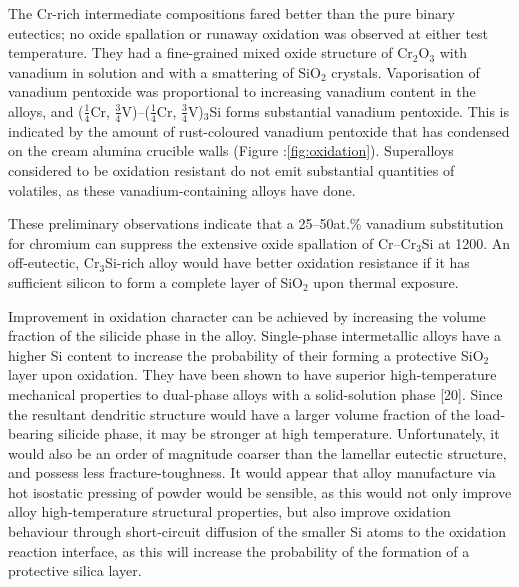 The Cr-rich intermediate compositions fared better than the pure binary eutectics; no oxide spallation or runaway oxidation was observed at either test temperature.  They had a fine-grained mixed oxide structure of Cr$_2$O$_3$ with vanadium in solution and with a smattering of SiO$_2$ crystals.  Vaporisation of vanadium pentoxide was proportional to increasing vanadium content in the alloys, and ($\frac{1}{4}$Cr, $\frac{3}{4}$V)--($\frac{1}{4}$Cr, $\frac{3}{4}$V)$_3$Si forms substantial vanadium pentoxide.  This is indicated by the amount of rust-coloured vanadium pentoxide that has condensed on the cream alumina crucible walls (Figure :\ref{fig:oxidation}).  Superalloys considered to be oxidation resistant do not emit substantial quantities of volatiles, as these vanadium-containing alloys have done. 

These preliminary observations indicate that a 25--50at.\% vanadium substitution for chromium can suppress the extensive oxide spallation of Cr--Cr$_3$Si at 1200\celsius.   An off-eutectic, Cr$_3$Si-rich alloy would have better oxidation resistance if it has sufficient silicon to form a complete layer of SiO$_2$ upon thermal exposure.

Improvement in oxidation character can be achieved by increasing the volume fraction of the silicide phase in the alloy.  Single-phase intermetallic alloys have a higher Si content to increase the probability of their forming a protective SiO$_2$ layer upon oxidation.  They have been shown to have superior high-temperature mechanical properties to dual-phase alloys with a solid-solution phase [20].  Since the resultant dendritic structure would have a larger volume fraction of the load-bearing silicide phase, it may be stronger at high temperature.  Unfortunately, it would also be an order of magnitude coarser than the lamellar eutectic structure, and possess less fracture-toughness.  It would appear that alloy manufacture via hot isostatic pressing of powder would be sensible, as this would not only improve alloy high-temperature structural properties, but also improve oxidation behaviour through short-circuit diffusion of the smaller Si atoms to the oxidation reaction interface, as this will increase the probability of the formation of a protective silica layer.

